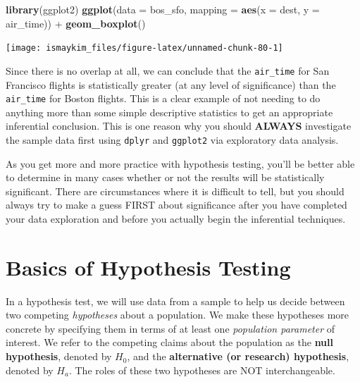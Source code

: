\documentclass[]{tufte-book}
\newenvironment{Shaded}{\begin{snugshade}}{\end{snugshade}}
\newcommand{\KeywordTok}[1]{\textcolor[rgb]{0.13,0.29,0.53}{\textbf{{#1}}}}
\newcommand{\DataTypeTok}[1]{\textcolor[rgb]{0.13,0.29,0.53}{{#1}}}
\newcommand{\StringTok}[1]{\textcolor[rgb]{0.31,0.60,0.02}{{#1}}}
\newcommand{\NormalTok}[1]{{#1}}
\begin{document}
\begin{Shaded}
\begin{Highlighting}[]
\KeywordTok{library}\NormalTok{(ggplot2)}
\KeywordTok{ggplot}\NormalTok{(}\DataTypeTok{data =} \NormalTok{bos_sfo, }\DataTypeTok{mapping =} \KeywordTok{aes}\NormalTok{(}\DataTypeTok{x =} \NormalTok{dest, }\DataTypeTok{y =} \NormalTok{air_time)) +}
\StringTok{  }\KeywordTok{geom_boxplot}\NormalTok{()}
\end{Highlighting}
\end{Shaded}

\begin{center}\texttt{[image: ismaykim\_files/figure-latex/unnamed-chunk-80-1]} \end{center}

Since there is no overlap at all, we can conclude that the
\texttt{air\_time} for San Francisco flights is statistically greater
(at any level of significance) than the \texttt{air\_time} for Boston
flights. This is a clear example of not needing to do anything more than
some simple descriptive statistics to get an appropriate inferential
conclusion. This is one reason why you should \textbf{ALWAYS}
investigate the sample data first using \texttt{dplyr} and
\texttt{ggplot2} via exploratory data analysis.

As you get more and more practice with hypothesis testing, you'll be
better able to determine in many cases whether or not the results will
be statistically significant. There are circumstances where it is
difficult to tell, but you should always try to make a guess FIRST about
significance after you have completed your data exploration and before
you actually begin the inferential techniques.

\section{Basics of Hypothesis
Testing}\label{basics-of-hypothesis-testing}

In a hypothesis test, we will use data from a sample to help us decide
between two competing \emph{hypotheses} about a population. We make
these hypotheses more concrete by specifying them in terms of at least
one \emph{population parameter} of interest. We refer to the competing
claims about the population as the \textbf{null hypothesis}, denoted by
\(H_0\), and the \textbf{alternative (or research) hypothesis}, denoted
by \(H_a\). The roles of these two hypotheses are NOT interchangeable.
\end{document}
